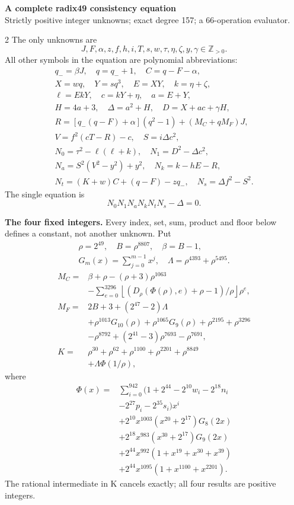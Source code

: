 \documentclass[10pt]{article}
\newcommand{\fl}[1]{\left\lfloor#1\right\rfloor}
\begin{document}
\begin{center}
{\large\bfseries A complete radix49 consistency equation}\\[-1pt]
{\small Strictly positive integer unknowns; exact degree 157; a 66-operation evaluator.}
\end{center}\vspace{-8pt}
\begin{multicols}{2}
\fontsize{9}{9.5}\selectfont
The only unknowns are
\[
J,F,\alpha,z,f,h,i,T,s,w,\tau,\eta,\zeta,y,\gamma\in\mathbb Z_{>0}.
\]
All other symbols in the equation are polynomial abbreviations:
\[
\begin{gathered}
q_-=\beta J,\quad q=q_-+1,\quad C=q-F-\alpha,\\
X=wq,\quad Y=sq^3,\quad E=XY,\quad k=\eta+\zeta,\\
\ell=EkY,\quad c=kY+\eta,\quad a=E+Y,\\
H=4a+3,\quad\Delta=a^2+H,\quad D=X+ac+\gamma H,\\
R=[q_-(q-F)+\alpha](q^2-1)+(M_C+qM_F)J,\\
V=f^2(cT-R)-c,\quad S=i\Delta c^2,\\
N_0=\tau^2-\ell(\ell+k),\quad N_1=D^2-\Delta c^2,\\
N_a=S^2(V^2-y^2)+y^2,\quad N_k=k-hE-R,\\
N_t=(K+w)C+(q-F)-zq_-,\quad N_s=\Delta f^2-S^2.
\end{gathered}
\]
The single equation is
\[
\boxed{N_0N_1N_aN_kN_tN_s-\Delta=0.}
\]

\textbf{The four fixed integers.}
Every index, set, sum, product and floor below defines a constant, not
another unknown. Put
\[
\begin{gathered}
\rho=2^{49},\quad B=\rho^{8807},\quad\beta=B-1,\\
G_m(x)=\sum_{j=0}^{m-1}x^j,\quad
\Lambda=\rho^{4393}+\rho^{5495}.
\end{gathered}
\]
\begin{align*}
M_C={}&\beta+\rho-(\rho+3)\rho^{1063}\\
&-\sum_{e=0}^{3296}\fl{(D_\rho(\Phi(\rho),e)+\rho-1)/\rho}\rho^e,\\
M_F={}&2B+3+(2^{47}-2)\Lambda\\
&+\rho^{1013}G_{10}(\rho)+\rho^{1065}G_9(\rho)
  +\rho^{2195}+\rho^{3296}\\
&-\rho^{8792}+(2^{41}-3)\rho^{7693}-\rho^{7691},\\
K={}&\rho^{30}+\rho^{62}+\rho^{1100}+\rho^{2201}+\rho^{8849}\\
&+\Lambda\Phi(1/\rho),
\end{align*}
where
\[
\begin{split}
\Phi(x)={}&\sum_{i=0}^{942}(1+2^{44}-2^{10}w_i-2^{18}n_i\\
&-2^{27}p_i-2^{35}s_i)x^i\\
&+2^{10}x^{1003}(x^{20}+2^{17})G_8(2x)\\
&+2^{18}x^{983}(x^{30}+2^{17})G_9(2x)\\
&+2^{44}x^{992}(1+x^{19}+x^{30}+x^{39})\\
&+2^{44}x^{1095}(1+x^{1100}+x^{2201}).
\end{split}
\]
The rational intermediate in K cancels exactly; all four results are positive integers.


\end{multicols}
\end{document}
